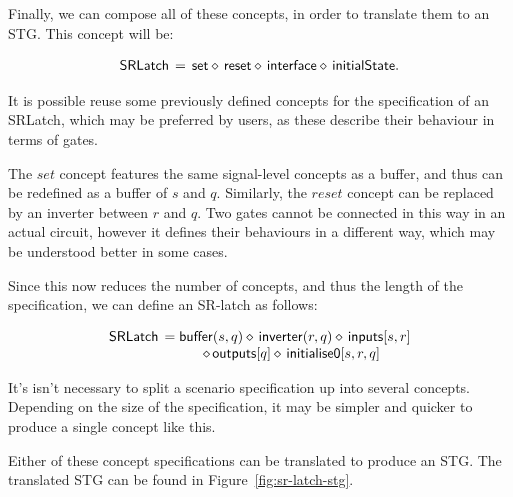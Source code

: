 \documentclass[british,conference,compsoc]{IEEEtran}
\begin{document}
\noindent Finally, we can compose all of these concepts, in order to translate them to an STG. This concept will be:


\[
\begin{array}{lcl}
\mathsf{SRLatch}&\hspace{-2mm}=&\hspace{-2mm}\mathsf{set} \diamond\, \mathsf{reset} \diamond\, \mathsf{interface} 
\diamond\, \mathsf{initialState}.
\end{array}
\]

\noindent It is possible reuse some previously defined concepts for the specification of an SRLatch,
which may be preferred by users, as these describe their behaviour in terms of gates.  

The $set$ concept features the same signal-level concepts as a buffer, and thus can be redefined
as a buffer of $s$ and $q$. Similarly, the $reset$ concept can be replaced by an inverter between
$r$ and $q$. Two gates cannot be connected in this way in an actual circuit, however
it defines their behaviours in a different way, which may be understood better in some cases.

Since this now reduces the number of concepts, and thus the length of the specification, we
can define an SR-latch as follows:


 \[
\begin{array}{lcl}
\mathsf{SRLatch}&\hspace{-2mm}=\mathsf{buffer}(s, q) \diamond\, \mathsf{inverter}(r, q) \diamond\, \mathsf{inputs}[s, r]\\ 
&\diamond\, \mathsf{outputs}[q] \diamond\, \mathsf{initialise0} [s, r, q]
\end{array}
\]

\noindent It's isn't necessary to split a scenario specification up into several concepts. 
Depending on the size of the specification, it may be simpler and quicker to 
produce a single concept like this.

Either of these concept specifications can be translated to produce an STG. 
The translated STG can be found in Figure~\ref{fig:sr-latch-stg}.

\end{document}
